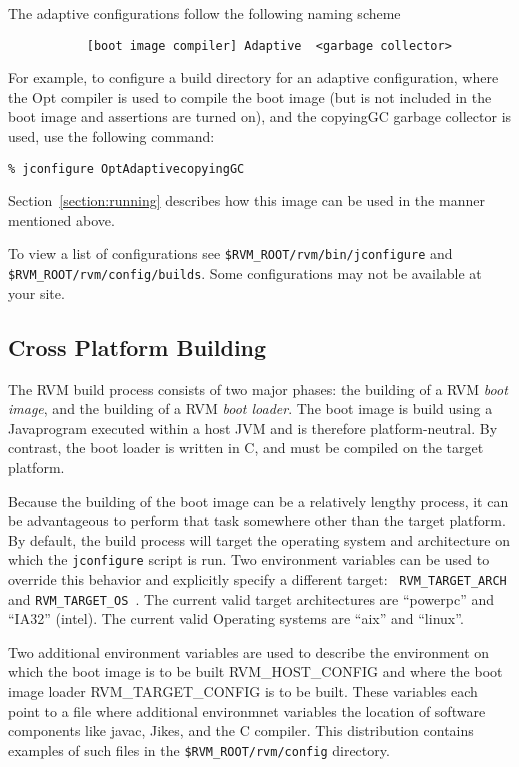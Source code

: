 The adaptive configurations follow the following naming scheme
\begin{verbatim}
           [boot image compiler] Adaptive  <garbage collector>
\end{verbatim}

For example, to configure a build 
directory for an adaptive configuration, where the Opt compiler is 
used to compile the boot image (but is not included in the boot image
and assertions are turned on), and the copyingGC garbage collector is
used, use the following command:

\begin{verbatim}
% jconfigure OptAdaptivecopyingGC
\end{verbatim}

Section~\ref{section:running} describes how this image can be used in
the manner mentioned above.

To view a list of configurations see 
{\tt \$RVM\_ROOT/rvm/bin/jconfigure} and
{\tt \$RVM\_ROOT/rvm/config/builds}. 
Some configurations may not be available at your site. 

\subsection{Cross Platform Building}

The RVM build process consists of two major phases: the building of a
RVM {\em boot image}, and the building of a RVM {\em boot loader}.
The boot image is build using a Java\trademark program executed within a host
JVM and is therefore platform-neutral.  By contrast, the boot loader
is written in C, and must be compiled on the target platform.

Because the building of the boot image can be a relatively lengthy
process, it can be advantageous to perform that task somewhere other
than the target platform.  By default, the build process will target
the operating system and architecture on which the {\tt jconfigure}
script is run.  
    Two environment variables can be used to
override this behavior and explicitly specify a different target: {\tt
  RVM\_TARGET\_ARCH } and {\tt RVM\_TARGET\_OS }. The current valid target
architectures are ``powerpc'' and ``IA32'' (intel). The current valid
Operating systems are ``aix'' and ``linux''.

    Two additional environment variables are used to describe the 
environment on which the boot image is to be built RVM\_HOST\_CONFIG  and where
the boot image loader  RVM\_TARGET\_CONFIG is to be built. These variables
each point to a file where additional environmnet variables the location
of software components like javac, Jikes\trademark, and the C compiler. 
This distribution
contains examples of such files in the {\tt \$RVM\_ROOT/rvm/config} directory.   

